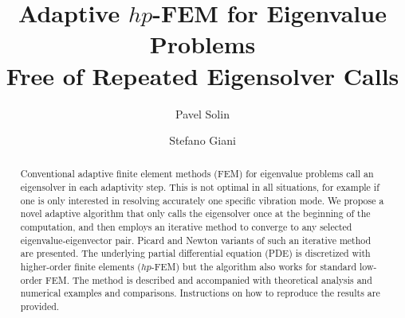 \documentclass[preprint,12pt]{elsarticle}
\begin{document}
\begin{frontmatter}



\title{Adaptive $hp$-FEM for Eigenvalue Problems\\ Free of Repeated 
       Eigensolver Calls}

\author[label1,label2]{Pavel Solin}
\author[label3]{Stefano Giani}
\address[label1]{Department of Mathematics and Statistics, University of Nevada, Reno, USA}
\address[label2]{Institute of Thermomechanics, Academy of Sciences of the Czech Republic, Prague}
\address[label3]{School of Mathematical Sciences, University of Nottingham, United Kingdom}



\begin{abstract}

Conventional adaptive finite element methods (FEM) for eigenvalue problems call 
an eigensolver in each adaptivity step. This is not optimal in all situations, 
for example if one is only interested in resolving accurately one specific 
vibration mode. We propose a novel adaptive algorithm that only calls the 
eigensolver once at the beginning of the computation, and then employs an 
iterative method to converge to any selected eigenvalue-eigenvector pair. 
Picard and Newton variants of such an iterative method are presented. The 
underlying partial differential equation (PDE) is discretized with higher-order 
finite elements ($hp$-FEM) but the algorithm also works for standard 
low-order FEM. The method is described and accompanied with theoretical 
analysis and numerical examples and comparisons. Instructions on how to 
reproduce the results are provided. 
\end{abstract}


\end{frontmatter}
\end{document}
